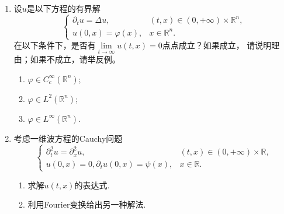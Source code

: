 \begin{enumerate}
    \item
    设$u$是以下方程的有界解
    $$\begin{cases}
		\partial_tu=\Delta u, &(t,x)\in (0, +\infty)\times \mathbb R^n,\\
        u(0,x)=\varphi(x), &x \in \mathbb R^n.
    \end{cases}$$
    在以下条件下，是否有$\lim\limits_{t\to\infty}u(t,x)=0$点点成立？如果成立，
    请说明理由；如果不成立，请举反例。
    \begin{enumerate}[label=(\roman*)]
        \item $\varphi \in C_c^{\infty}(\mathbb R^n)$;
        \item $\varphi \in L^2(\mathbb R^n)$;
        \item $\varphi \in L^{\infty}(\mathbb R^n)$.
    \end{enumerate}

    \item
    考虑一维波方程的Cauchy问题
    $$\begin{cases}
		\partial^2_tu=\partial^2_xu, &(t,x)\in (0, +\infty)\times \mathbb R,\\
        u(0,x)=0, \partial_tu(0,x)=\psi(x), &x \in \mathbb R.
    \end{cases}$$
    \begin{enumerate}[label=(\arabic*)]
        \item 求解$u(t,x)$的表达式.
        \item 利用Fourier变换给出另一种解法.
    \end{enumerate}
\end{enumerate}

